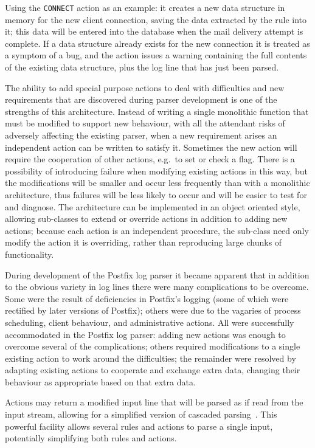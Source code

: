 \documentclass[preprint,draft,numbers]{elsarticle}
\begin{document}
Using the \texttt{CONNECT} action as an example: it creates a new data
structure in memory for the new client connection, saving the data
extracted by the rule into it; this data will be entered into the database
when the mail delivery attempt is complete.  If a data structure already
exists for the new connection it is treated as a symptom of a bug, and the
action issues a warning containing the full contents of the existing data
structure, plus the log line that has just been parsed.

The ability to add special purpose actions to deal with difficulties and
new requirements that are discovered during parser development is one of
the strengths of this architecture.  Instead of writing a single monolithic
function that must be modified to support new behaviour, with all the
attendant risks of adversely affecting the existing parser, when a new
requirement arises an independent action can be written to satisfy it.
Sometimes the new action will require the cooperation of other actions,
e.g.\ to set or check a flag.  There is a possibility of introducing
failure when modifying existing actions in this way, but the modifications
will be smaller and occur less frequently than with a monolithic
architecture, thus failures will be less likely to occur and will be easier to test
for and diagnose.  The architecture can be implemented in an object
oriented style, allowing sub-classes to extend or override actions in
addition to adding new actions; because each action is an independent
procedure, the sub-class need only modify the action it is overriding,
rather than reproducing large chunks of functionality.

During development of the Postfix log parser it became apparent that in
addition to the obvious variety in log lines there were many complications
to be overcome.  Some were the result of deficiencies in Postfix's logging
(some of which were rectified by later versions of Postfix); others were
due to the vagaries of process scheduling, client behaviour, and
administrative actions.  All were successfully accommodated in the Postfix
log parser: adding new actions was enough to overcome several of the
complications; others required modifications to a single existing action to
work around the difficulties; the remainder were resolved by adapting
existing actions to cooperate and exchange extra data, changing their
behaviour as appropriate based on that extra data.

Actions may return a modified input line that will be parsed as if read
from the input stream, allowing for a simplified version of cascaded
parsing~\cite{cascaded-parsing}.  This powerful facility allows several
rules and actions to parse a single input, potentially simplifying both
rules and actions.
\end{document}
